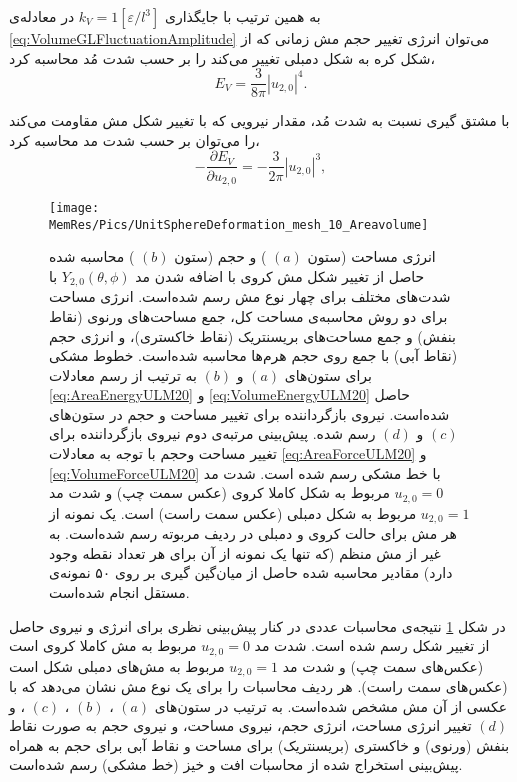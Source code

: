 به همین ترتیب با جایگذاری 
$k_V=1[\varepsilon/l^3]$
در معادله‌ی
\ref{eq:VolumeGLFluctuationAmplitude}
می‌توان انرژی تغییر حجم مش زمانی که از  شکل کره به شکل دمبلی تغییر می‌کند را بر حسب شدت مُد محاسبه کرد،
\begin{equation}
E_V= \frac{3}{8\pi}|u_{2,0}|^4.
\label{eq:VolumeEnergyULM20}
\end{equation}

با مشتق ‌گیری نسبت به شدت مُد، مقدار نیرویی که با تغییر شکل مش مقاومت می‌کند را می‌توان بر حسب شدت مد محاسبه کرد،
\begin{equation}
-\frac{\partial E_V}{\partial u_{2,0}}= -\frac{3}{2\pi}|u_{2,0}|^3,
\label{eq:VolumeForceULM20}
\end{equation}

\begin{figure}[tbp]
\begin{center}
\texttt{[image: \\MemRes/Pics/UnitSphereDeformation\_mesh\_10\_Areavolume]}
\caption{
انرژی مساحت (ستون 
$(a)$
) و حجم (ستون 
$(b)$
) محاسبه‌ شده حاصل از تغییر شکل مش کروی با اضافه شدن مد
$Y_{2,0}(\theta,\phi)$
با شدت‌های مختلف برای چهار نوع مش رسم شده‌است. انرژی مساحت برای دو روش محاسبه‌ی مساحت کل، جمع مساحت‌های ورنوی (نقاط بنفش) و جمع مساحت‌های بریسنتریک (نقاط خاکستری)، و انرژی حجم (نقاط آبی) با جمع روی حجم هرم‌ها محاسبه شده‌است. خطوط مشکی برای ستون‌های 
$(a)$
و
$(b)$
به ترتیب از رسم معادلات
\ref{eq:AreaEnergyULM20}
و
\ref{eq:VolumeEnergyULM20}
حاصل شده‌است. نیروی بازگرداننده برای تغییر مساحت و حجم در ستون‌های 
$(c)$
و
$(d)$
رسم شده.  پیش‌بینی‌ مرتبه‌ی دوم نیروی بازگرداننده برای تغییر مساحت وحجم با توجه به معادلات
\ref{eq:AreaForceULM20}
و
\ref{eq:VolumeForceULM20}
با خط مشکی رسم شده است. شدت مد 
$u_{2,0}=0$
مربوط به شکل کاملا کروی (عکس سمت چپ) و شدت مد 
$u_{2,0}=1$
مربوط به شکل دمبلی (عکس سمت راست) است. یک نمونه از هر مش برای حالت کروی و دمبلی در ردیف مربوته رسم شده‌است. به غیر از مش منظم (که تنها یک نمونه از آن برای هر تعداد نقطه وجود دارد) مقادیر محاسبه شده حاصل از میان‌گین گیری بر روی ۵۰ نمونه‌ی مستقل انجام شده‌است.
}
\label{fig:unitsphereAreaVolumeULM20}
\end{center}
\end{figure}


در شکل
\ref{fig:unitsphereAreaVolumeULM20}
نتیجه‌ی محاسبات عددی در کنار پیش‌بینی نظری برای انرژی و نیروی حاصل از تغییر شکل رسم شده است. شدت مد
$u_{2,0}=0$
مربوط به مش کاملا کروی است (عکس‌های سمت چپ) و شدت مد 
$u_{2,0}=1$
مربوط به مش‌های دمبلی شکل است (عکس‌های سمت راست). هر ردیف محاسبات را برای یک نوع مش نشان می‌دهد که با  عکسی از آن مش مشخص شده‌است. به ترتیب در ستون‌های 
$(a)$
،
$(b)$
،
$(c)$
، و
$(d)$
تغییر انرژی مساحت، انرژی حجم، نیروی مساحت، و نیروی حجم به صورت نقاط بنفش (ورنوی) و خاکستری (بریسنتریک) برای مساحت و نقاط آبی برای حجم به همراه پیش‌بینی استخراج شده از محاسبات افت و خیز (خط مشکی) رسم شده‌است. 

